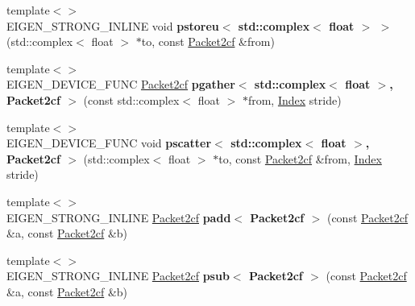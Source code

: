 \begin{DoxyCompactItemize}
\item 
\mbox{\label{namespace_eigen_1_1internal_aadfc98cfacfcecb48758462adb602ec5}} 
{\footnotesize template$<$$>$ }\\E\+I\+G\+E\+N\+\_\+\+S\+T\+R\+O\+N\+G\+\_\+\+I\+N\+L\+I\+NE void {\bfseries pstoreu$<$ std\+::complex$<$ float $>$ $>$} (std\+::complex$<$ float $>$ $\ast$to, const \hyperlink{struct_eigen_1_1internal_1_1_packet2cf}{Packet2cf} \&from)
\item 
\mbox{\label{namespace_eigen_1_1internal_a32397fe26d21257ea1050bbdb1926e83}} 
{\footnotesize template$<$$>$ }\\E\+I\+G\+E\+N\+\_\+\+D\+E\+V\+I\+C\+E\+\_\+\+F\+U\+NC \hyperlink{struct_eigen_1_1internal_1_1_packet2cf}{Packet2cf} {\bfseries pgather$<$ std\+::complex$<$ float $>$, Packet2cf $>$} (const std\+::complex$<$ float $>$ $\ast$from, \hyperlink{namespace_eigen_a62e77e0933482dafde8fe197d9a2cfde}{Index} stride)
\item 
\mbox{\label{namespace_eigen_1_1internal_aea1bbf9163a69da80cbf07c4c2a50091}} 
{\footnotesize template$<$$>$ }\\E\+I\+G\+E\+N\+\_\+\+D\+E\+V\+I\+C\+E\+\_\+\+F\+U\+NC void {\bfseries pscatter$<$ std\+::complex$<$ float $>$, Packet2cf $>$} (std\+::complex$<$ float $>$ $\ast$to, const \hyperlink{struct_eigen_1_1internal_1_1_packet2cf}{Packet2cf} \&from, \hyperlink{namespace_eigen_a62e77e0933482dafde8fe197d9a2cfde}{Index} stride)
\item 
\mbox{\label{namespace_eigen_1_1internal_ade9c3ce8224bc8269e6e6a6a0a73bdd1}} 
{\footnotesize template$<$$>$ }\\E\+I\+G\+E\+N\+\_\+\+S\+T\+R\+O\+N\+G\+\_\+\+I\+N\+L\+I\+NE \hyperlink{struct_eigen_1_1internal_1_1_packet2cf}{Packet2cf} {\bfseries padd$<$ Packet2cf $>$} (const \hyperlink{struct_eigen_1_1internal_1_1_packet2cf}{Packet2cf} \&a, const \hyperlink{struct_eigen_1_1internal_1_1_packet2cf}{Packet2cf} \&b)
\item 
\mbox{\label{namespace_eigen_1_1internal_ac886d302d69c1ccdd6a0ab7965336ed3}} 
{\footnotesize template$<$$>$ }\\E\+I\+G\+E\+N\+\_\+\+S\+T\+R\+O\+N\+G\+\_\+\+I\+N\+L\+I\+NE \hyperlink{struct_eigen_1_1internal_1_1_packet2cf}{Packet2cf} {\bfseries psub$<$ Packet2cf $>$} (const \hyperlink{struct_eigen_1_1internal_1_1_packet2cf}{Packet2cf} \&a, const \hyperlink{struct_eigen_1_1internal_1_1_packet2cf}{Packet2cf} \&b)

\end{DoxyCompactItemize}
